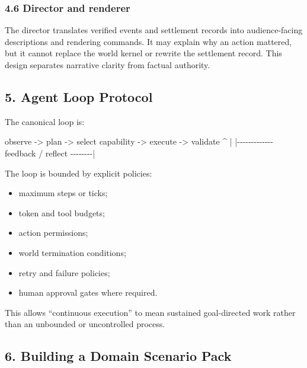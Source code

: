 \documentclass[
]{article}
\newenvironment{Shaded}{}{}
\newcommand{\NormalTok}[1]{#1}
\providecommand{\tightlist}{%
  \setlength{\itemsep}{0pt}\setlength{\parskip}{0pt}}
\begin{document}
\subsubsection{4.6 Director and
renderer}\label{46-director-and-renderer}

The director translates verified events and settlement records into
audience-facing descriptions and rendering commands. It may explain why
an action mattered, but it cannot replace the world kernel or rewrite
the settlement record. This design separates narrative clarity from
factual authority.

\subsection{5. Agent Loop Protocol}\label{5-agent-loop-protocol}

The canonical loop is:

\begin{Shaded}
\begin{Highlighting}[]
\NormalTok{observe {-}\textgreater{} plan {-}\textgreater{} select capability {-}\textgreater{} execute {-}\textgreater{} validate}
\NormalTok{    \^{}                                         |}
\NormalTok{    |{-}{-}{-}{-}{-}{-}{-}{-}{-}{-}{-}{-}{-} feedback / reflect {-}{-}{-}{-}{-}{-}{-}{-}|}
\end{Highlighting}
\end{Shaded}

The loop is bounded by explicit policies:

\begin{itemize}
\tightlist
\item
  maximum steps or ticks;
\item
  token and tool budgets;
\item
  action permissions;
\item
  world termination conditions;
\item
  retry and failure policies;
\item
  human approval gates where required.
\end{itemize}

This allows ``continuous execution'' to mean sustained goal-directed
work rather than an unbounded or uncontrolled process.

\subsection{6. Building a Domain Scenario
Pack}\label{6-building-a-domain-scenario-pack}
\end{document}
